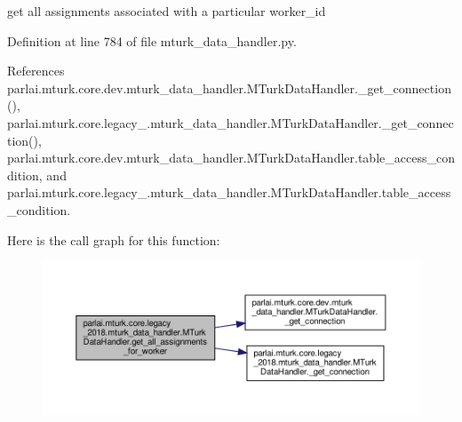 \begin{DoxyVerb}get all assignments associated with a particular worker_id\end{DoxyVerb}
 

Definition at line 784 of file mturk\+\_\+data\+\_\+handler.\+py.



References parlai.\+mturk.\+core.\+dev.\+mturk\+\_\+data\+\_\+handler.\+M\+Turk\+Data\+Handler.\+\_\+get\+\_\+connection(), parlai.\+mturk.\+core.\+legacy\+\_.\+mturk\+\_\+data\+\_\+handler.\+M\+Turk\+Data\+Handler.\+\_\+get\+\_\+connection(), parlai.\+mturk.\+core.\+dev.\+mturk\+\_\+data\+\_\+handler.\+M\+Turk\+Data\+Handler.\+table\+\_\+access\+\_\+condition, and parlai.\+mturk.\+core.\+legacy\+\_.\+mturk\+\_\+data\+\_\+handler.\+M\+Turk\+Data\+Handler.\+table\+\_\+access\+\_\+condition.

Here is the call graph for this function\+:
\nopagebreak
\begin{figure}[H]
\begin{center}
\leavevmode
\includegraphics[width=350pt]{classparlai_1_1mturk_1_1core_1_1legacy__2018_1_1mturk__data__handler_1_1MTurkDataHandler_a7cf4512d458d9e2d2867f4252f1ac2f9_cgraph}
\end{center}
\end{figure}
\mbox{\label{classparlai_1_1mturk_1_1core_1_1legacy__2018_1_1mturk__data__handler_1_1MTurkDataHandler_ac4805766f3155d1768d3aff70aaf404c}} 
